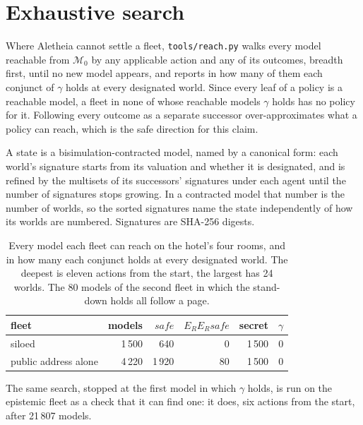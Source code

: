 \documentclass[11pt,a4paper]{article}
\theoremstyle{definition}
\newcommand{\Mod}{\mathcal{M}}
\newcommand{\code}[1]{\texttt{\small #1}}
\newcommand{\safe}{\mathit{safe}}
\begin{document}
\section{Exhaustive search}
\label{sec:reach}

Where Aletheia cannot settle a fleet, \code{tools/reach.py} walks every model
reachable from $\Mod_0$ by any applicable action and any of its outcomes,
breadth first, until no new model appears, and reports in how many of them each
conjunct of $\gamma$ holds at every designated world. Since every leaf of a policy
is a reachable model, a fleet in none of whose reachable models $\gamma$ holds
has no policy for it. Following every outcome as a separate successor
over-approximates what a policy can reach, which is the safe direction for this
claim.

A state is a bisimulation-contracted model, named by a canonical form: each
world's signature starts from its valuation and whether it is designated, and is
refined by the multisets of its successors' signatures under each agent until the
number of signatures stops growing. In a contracted model that number is the
number of worlds, so the sorted signatures name the state independently of how
its worlds are numbered. Signatures are SHA-256 digests.

\begin{table}[H]
\centering\small
\begin{tabular}{@{}l r r r r r@{}}
\toprule
fleet & models & $\safe$ & $E_RE_R\safe$ & secret & $\gamma$ \\
\midrule
siloed & 1\,500 & 640 & 0 & 1\,500 & 0 \\
public address alone & 4\,220 & 1\,920 & 80 & 1\,500 & 0 \\
\bottomrule
\end{tabular}
\caption{Every model each fleet can reach on the hotel's four rooms, and in how
many each conjunct holds at every designated world. The deepest is eleven
actions from the start, the largest has 24 worlds. The 80 models of the second
fleet in which the stand-down holds all follow a page.}
\label{tab:reach}
\end{table}

The same search, stopped at the first model in which $\gamma$ holds, is run on
the epistemic fleet as a check that it can find one: it does, six actions from
the start, after 21\,807 models.

\end{document}
